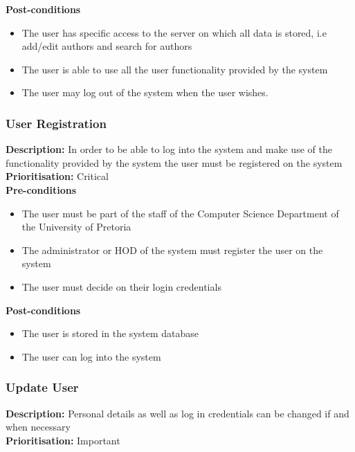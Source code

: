 \documentclass[a4paper]{article}
\begin{document}
    \textbf{Post-conditions}
     \begin{itemize}
        \item The user has specific access to the server on which all data is stored, i.e add/edit authors and search for authors
        \item The user is able to use all the user functionality provided by the system 
        \item The user may log out of the system when the user wishes.
    \end{itemize}
    
    \subsubsection{User Registration}
    
    \textbf{Description:}  In order to be able to log into the system and make use of the functionality provided by the system the user must be registered on the system \\
    \textbf{Prioritisation:} Critical\\
   
    \textbf{Pre-conditions}
     \begin{itemize}
        \item The user must be part of the staff of the Computer Science Department of the University of Pretoria
        \item The administrator or HOD of the system must register the user on the system
        \item The user must decide on their login credentials
   \end{itemize}
    
    \textbf{Post-conditions}
    \begin{itemize}
        \item The user is stored in the system database
        \item The user can log into the system
    \end{itemize}
    \pagebreak
    \subsubsection{Update User}
   
    \textbf{Description:} Personal details as well as log in credentials can be changed if and when necessary\\
     \textbf{Prioritisation:} Important\\
     
\end{document}
